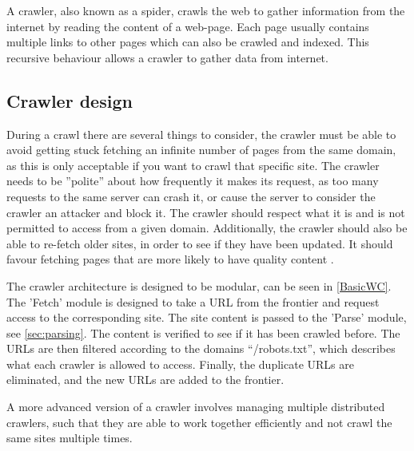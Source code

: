 A crawler, also known as a spider, crawls the web to gather information from the
internet by reading the content of a web-page. Each page usually contains
multiple links to other pages which can also be crawled and indexed. This
recursive behaviour allows a crawler to gather data from internet.

\subsection{Crawler design}%
During a crawl there are several things to consider, the crawler must be able
to avoid getting stuck fetching an infinite number of pages from the same
domain, as this is only acceptable if you want to crawl that specific site. The
crawler needs to be ''polite'' about how frequently it makes its request, as
too many requests to the same server can crash it, or cause the server to
consider the crawler an attacker and block it. The crawler should respect what
it is and is not permitted to access from a given domain. Additionally, the
crawler should also be able to re-fetch older sites, in order to see if they
have been updated. It should favour fetching pages that are more likely to have
quality content \citep[Ch. 20.1]{manning2008introduction}.\nl

The crawler architecture is designed to be modular, can be seen in
\autoref{BasicWC}. The 'Fetch' module is designed to take a URL from the
frontier and request access to the corresponding site. The site content is
passed to the 'Parse' module, see \autoref{sec:parsing}.
The content is verified to see if it has been crawled before. The URLs are then
filtered according to the domains ``/robots.txt'', which describes what each
crawler is allowed to access. Finally, the duplicate URLs are eliminated, and
the new URLs are added to the frontier.


A more advanced version of a crawler involves managing multiple distributed
crawlers, such that they are able to work together efficiently and not crawl
the same sites multiple times.

